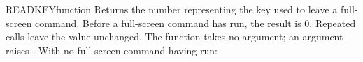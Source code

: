 \begin{XbaseEntry}{READKEY}{function}
Returns the number representing the key used to leave a full-screen command.
\Syntax
{}
\Usage
Before a full-screen command has run, the result is 0. Repeated calls leave
the value unchanged. The function takes no argument; an argument raises
.
\Examples
With no full-screen command having run:
\end{XbaseEntry}

